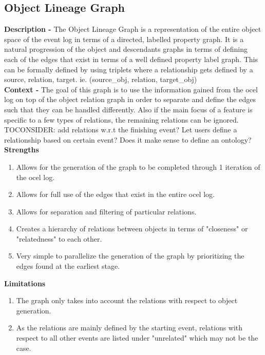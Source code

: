 \documentclass{article}
\begin{document}
\subsection{Object Lineage Graph}
\textbf{Description -} The Object Lineage Graph is a representation of the entire object space of the event log in terms of a directed, labelled property graph. It is a natural progression of the object and descendants graphs in terms of defining each of the edges that exist in terms of a well defined property label graph. This can be formally defined by using triplets where a relationship gets defined by a source, relation, target. ie. (source\_obj, relation, target\_obj)\\
\noindent\textbf{Context -} The goal of this graph is to use the information gained from the ocel log on top of the object relation graph in order to separate and define the edges such that they can be handled differently. Also if the main focus of a feature is specific to a few types of relations, the remaining relations can be ignored. TOCONSIDER: add relations w.r.t the finishing event? Let users define a relationship based on certain event? Does it make sense to define an ontology?\\
\noindent\textbf{Strengths}\\
\begin{enumerate}
	\item Allows for the generation of the graph to be completed through 1 iteration of the ocel log.
	\item Allows for full use of the edges that exist in the entire ocel log.
	\item Allows for separation and filtering of particular relations.
	\item Creates a hierarchy of relations between objects in terms of "closeness" or "relatedness" to each other.
	\item Very simple to parallelize the generation of the graph by prioritizing the edges found at the earliest stage.
\end{enumerate}
\noindent\textbf{Limitations}\\
\begin{enumerate}
	\item The graph only takes into account the relations with respect to object generation.
	\item As the relations are mainly defined by the starting event, relations with respect to all other events are listed under "unrelated" which may not be the case.
\end{enumerate}
\end{document}
